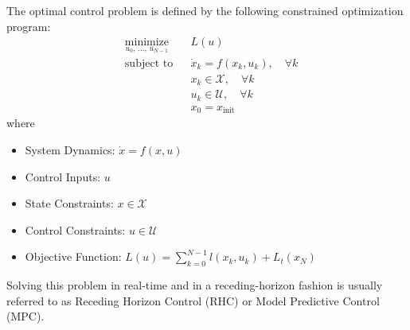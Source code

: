 \documentclass[letterpaper, 10 pt, conference]{ieeeconf}  %
\begin{document}
	The optimal control problem is defined by the following constrained optimization program:
	\begin{equation}
		\begin{aligned}
			& \underset{u_0,\,\ldots,\,u_{N-1}}{\text{minimize}}
			& & L(u) \\
			& \text{subject to}
			& & \dot{x}_k = f(x_k, u_k), \quad \forall k \\
			& & & x_k \in \mathcal{X}, \quad \forall k \\
			& & & u_k \in \mathcal{U}, \quad \forall k \\
			& & & x_0 = x_{\text{init}}
		\end{aligned}
	\end{equation}
	where
	\begin{itemize}
		\item System Dynamics: $\dot{x} = f(x, u)$
		\item Control Inputs: $u$
		\item State Constraints: $x \in \mathcal{X}$
		\item Control Constraints: $u \in \mathcal{U}$
		\item Objective Function: $L(u) = \sum_{k=0}^{N-1} l(x_k, u_k) + L_t(x_N)$
	\end{itemize}
	Solving this problem in real-time and in a receding-horizon fashion is usually referred to as Receding Horizon Control (RHC) or Model Predictive Control (MPC). 
	
\end{document}
